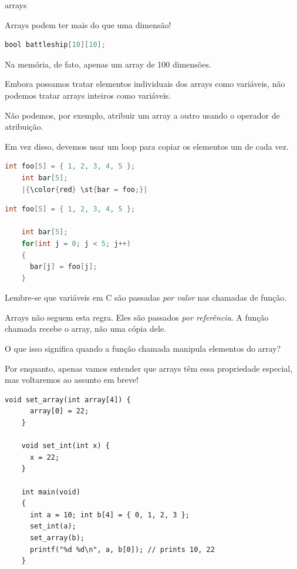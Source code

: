 \documentclass{beamer}
\begin{document}
\begin{frame}{arrays}
  \framebreak

  Arrays podem ter mais do que uma dimensão!

  \begin{lstlisting}[language=C,escapechar={|},basicstyle=\ttfamily]
    bool battleship[10][10];
  \end{lstlisting}

  Na memória, de fato, apenas um array de 100 dimensões.

  \framebreak

  Embora possamos tratar elementos individuais dos arrays como
  variáveis, não podemos tratar arrays inteiros como variáveis.
  
  Não podemos, por exemplo, atribuir um array a outro usando o
  operador de atribuição.

  Em vez disso, devemos usar um loop para copiar os elementos um de
  cada vez.

  \begin{lstlisting}[language=C,escapechar={|},basicstyle=\ttfamily]
    int foo[5] = { 1, 2, 3, 4, 5 };
    int bar[5];
    |{\color{red} \st{bar = foo;}|
  \end{lstlisting}

  \framebreak

  \begin{lstlisting}[language=C,escapechar={|},basicstyle=\ttfamily]
    int foo[5] = { 1, 2, 3, 4, 5 };
    
    int bar[5];
    for(int j = 0; j < 5; j++)
    {
      bar[j] = foo[j];
    }    
  \end{lstlisting}

  \framebreak

  Lembre-se que variáveis em C são passadas \emph{por valor} nas chamadas de função.
  
  Arrays não seguem esta regra. Eles são passados \emph{por
    referência}. A função chamada recebe o array, não uma cópia dele.
  
  O que isso significa quando a função chamada manipula elementos do array?
  
  Por enquanto, apenas vamos entender que arrays têm essa propriedade
  especial, mas voltaremos ao assunto em breve!

  \framebreak

  \begin{lstlisting}[style=ssc]
    void set_array(int array[4]) {
      array[0] = 22;
    }
    
    void set_int(int x) {
      x = 22;
    }
    
    int main(void)
    {
      int a = 10; int b[4] = { 0, 1, 2, 3 };
      set_int(a);
      set_array(b);
      printf("%d %d\n", a, b[0]); // prints 10, 22
    }
  \end{lstlisting}

\end{frame}
\end{document}
